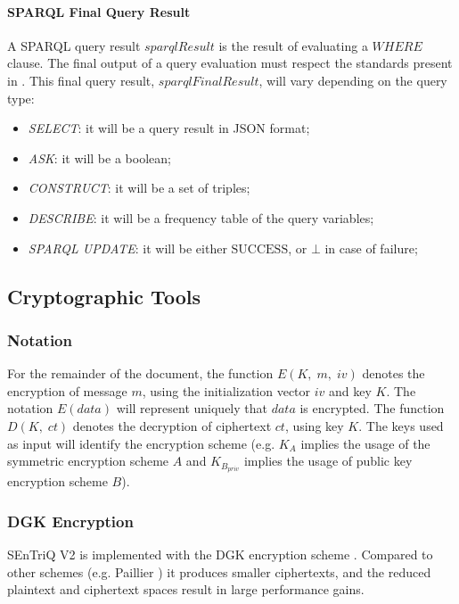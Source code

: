 \paragraph{SPARQL Final Query Result} A \gls{SPARQL} query result $sparqlResult$ is the result of evaluating a $WHERE$ clause. The final output of a query evaluation must respect the standards present in \cite{W3c2013-hd, W3c_undated-tw}. This final query result, $sparqlFinalResult$, will vary depending on the query type:
\begin{itemize}
    \item \textit{SELECT}: it will be a query result in JSON format;
    \item \textit{ASK}: it will be a boolean;
    \item \textit{CONSTRUCT}: it will be a set of triples;
    \item \textit{DESCRIBE}: it will be a frequency table of the query variables;
    \item \textit{SPARQL UPDATE}: it will be either $\textrm{SUCCESS}$, or $\bot$ in case of failure;
\end{itemize}

\vfill
\pagebreak


\subsection{Cryptographic Tools}

\subsubsection{Notation}

For the remainder of the document, the function $E(K, \; m, \; iv)$ denotes the encryption of message $m$, using the initialization vector $iv$ and key $K$. The notation $E(data)$ will represent uniquely that $data$ is encrypted. The function $D(K, \; ct)$ denotes the decryption of ciphertext $ct$, using key $K$. The keys used as input will identify the encryption scheme (e.g. $K_{A}$ implies the usage of the symmetric encryption scheme $A$ and $K_{B_{priv}}$ implies the usage of public key encryption scheme $B$).

\subsubsection{DGK Encryption}

\gls{SEnTriQ} V2 is implemented with the \gls{DGK} encryption scheme \autocite{Damgard2007-km, Damgard2009-my, Franz2011-sm, Makkes2010-qb}. Compared to other schemes (e.g. Paillier \autocite{Paillier1999-js}) it produces smaller ciphertexts, and the reduced plaintext and ciphertext spaces result in large performance gains.

